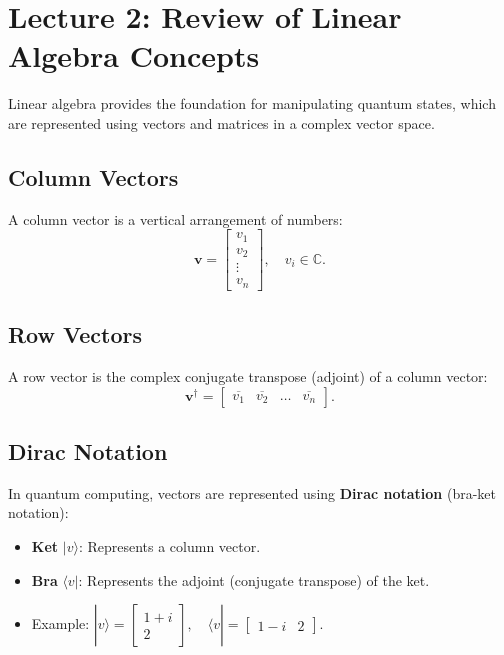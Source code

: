 \section{Lecture 2: Review of Linear Algebra Concepts}

Linear algebra provides the foundation for manipulating quantum states, which are represented using vectors and matrices in a complex vector space.


\subsection*{Column Vectors}
A column vector is a vertical arrangement of numbers:
\[
\mathbf{v} =
\begin{bmatrix}
v_1 \\
v_2 \\
\vdots \\
v_n
\end{bmatrix}, \quad v_i \in \mathbb{C}.
\]

\subsection*{Row Vectors}
A row vector is the complex conjugate transpose (adjoint) of a column vector:
\[
\mathbf{v}^\dagger =
\begin{bmatrix}
\overline{v_1} & \overline{v_2} & \dots & \overline{v_n}
\end{bmatrix}.
\]

\subsection*{Dirac Notation}
In quantum computing, vectors are represented using \textbf{Dirac notation} (bra-ket notation):
\begin{itemize}
    \item \textbf{Ket} \( |v\rangle \): Represents a column vector.
    \item \textbf{Bra} \( \langle v | \): Represents the adjoint (conjugate transpose) of the ket.
    \item Example: \( |v\rangle = \begin{bmatrix} 1 + i \\ 2 \end{bmatrix}, \quad \langle v | = \begin{bmatrix} 1 - i & 2 \end{bmatrix} \).
\end{itemize}

